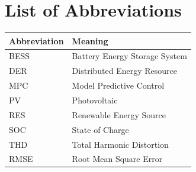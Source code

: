 \chapter*{List of Abbreviations}

\begin{center}
\renewcommand{\arraystretch}{1.25}
\begin{tabularx}{0.85\textwidth}{@{}l X@{}}
\toprule
\rowcolor{monashblue!10}
\textbf{Abbreviation} & \textbf{Meaning} \\
\midrule
BESS & Battery Energy Storage System \\
DER  & Distributed Energy Resource \\
MPC  & Model Predictive Control \\
PV   & Photovoltaic \\
RES  & Renewable Energy Source \\
SOC  & State of Charge \\
THD  & Total Harmonic Distortion \\
RMSE & Root Mean Square Error \\
\bottomrule
\end{tabularx}
\end{center}

\mainmatter

